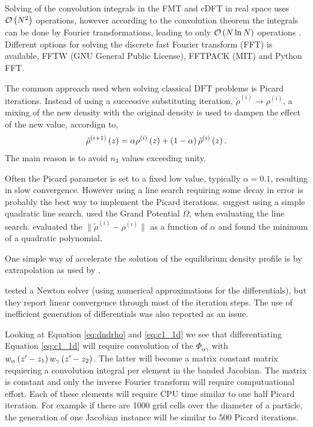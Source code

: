 \documentclass[12pt, letterpaper]{article}
\newcommand*{\lb}{\ensuremath{\left(}}
\newcommand*{\rb}{\ensuremath{\right)}}
\newcommand{\cdft}{\ensuremath{\text{classical DFT}}\xspace}
\begin{document}
Solving of the convolution integrals in the FMT and cDFT in real space
uses $\mathcal{O}\lb N^2 \rb$ operations, however according to the
convolution theorem the integrals can be done by Fourier
transformations, leading to only $\mathcal{O}\lb N \ln N \rb$
operations \cite{roth2010, knepley2010}. Different options for solving
the discrete fast Fourier transform (FFT) is available, FFTW (GNU
General Public License), FFTPACK (MIT) and Python FFT.

The common approach used when solving \cdft problems is Picard
iterations. Instead of using a successive substituting iteration,
$\tilde{\rho}^{(i)} \rightarrow \rho^{(i)}$, a mixing of the new
density with the original density is used to dampen the effect of the
new value, accordign to,
\begin{equation}
  \tilde{\rho}^{(i+1)}\lb z \rb = \alpha \rho^{(i)}\lb z \rb + \lb 1 - \alpha \rb \tilde{\rho}^{(i)}\lb z \rb.
\end{equation}
The main reason is to avoid $n_3$ values exceeding unity.

Often the Picard parameter is set to a fixed low value, typically
$\alpha=0.1$, resulting in slow convergence. However using a line
search requiring some decay in error is probably the best way to
implement the Picard iterations. \citet{roth2010} suggest using a
simple quadratic line search. \citet{roth2010} used the Grand
Potential $\Omega$, when evaluating the line
search. \cite{knepley2010} evaluated the
$\| \tilde{\rho}^{(i)} - \rho^{(i)} \|$ as a function of $\alpha$ and
found the minimum of a quadratic polynomial.

One simple way of accelerate the solution of the equilibrium density
profile is by extrapolation as used by \citet{ng1974}.

\cite{knepley2010} tested a Newton solver (using numerical
approximations for the differentials), but they report linear
convergence through most of the iteration steps. The use of
inefficient generation of differentials was also reported as an issue.

Looking at Equation \eqref{eq:dndrho} and \eqref{eq:c1_1d} we see that
differentiating Equation \eqref{eq:c1_1d} will require convolution of
the $\Phi_{\alpha\gamma}$ with
$w_\alpha \lb z^\prime - z_1\rb w_\gamma \lb z^\prime - z_2\rb$. The
latter will become a matrix constant matrix requiering a convolution
integral per element in the banded Jacobian. The matrix is constant
and only the inverse Fourier transform will require computuational
effort. Each of these elements will require CPU time similar to one
half Picard iteration. For example if there are 1000 grid cells over
the diameter of a particle, the generation of one Jacobian instance
will be similar to 500 Picard iterations.
\end{document}
